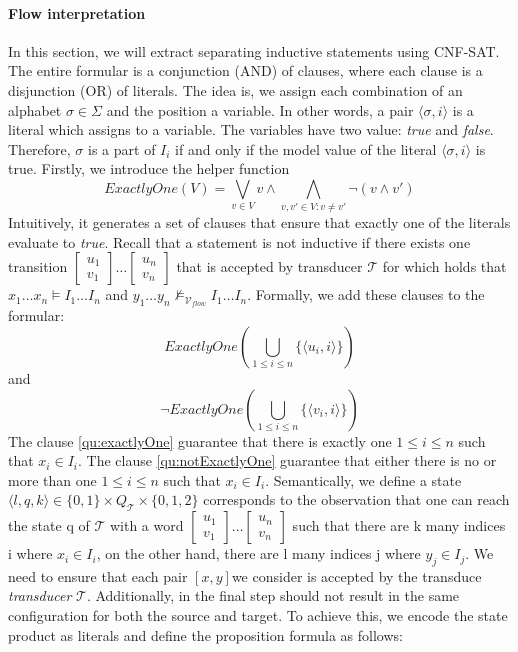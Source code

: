 \paragraph*{Flow interpretation}
In this section, we will extract separating inductive statements using CNF-SAT. 
The entire formular is a conjunction (AND) of clauses, where each clause is a disjunction (OR) of literals.
The idea is, we assign each combination of an alphabet $\sigma \in \Sigma$ and the position 
a variable. 
In other words, a pair $\langle \sigma, i \rangle$ is a literal which assigns to a variable.
The variables have two value: \textit{true} and \textit{false}.
Therefore, $\sigma$ is a part of $I_i$ if and only if the  model value of the literal $\langle \sigma, i \rangle$ is true.
Firstly, we introduce the helper function
\begin{equation*}
    ExactlyOne(V) = \bigvee_{v \in V} v \wedge \bigwedge_{v,v'\in V: v \neq v'} \lnot (v \wedge v')
\end{equation*}
Intuitively, it generates a set of clauses that ensure that exactly one of the 
literals evaluate to \textit{true}.
Recall that a statement is not inductive if there exists one transition
$[\substack{u_1 \\ v_1}] \dots [\substack{u_n \\ v_n}]$ that is accepted by transducer $\mathcal{T}$
for which holds that $x_1 \dots x_n \models I_1 \dots I_n$ and $y_1 \dots y_n \not\models_{\mathcal{V}_{flow}} I_1 \dots I_n$.
Formally, we add these clauses to the formular:
\begin{equation}\label{qu:exactlyOne}
    ExactlyOne(\bigcup_{1 \leq i \leq n} \{ \langle u_i, i \rangle \})
\end{equation}
and 
\begin{equation}\label{qu:notExactlyOne}
    \lnot ExactlyOne(\bigcup_{1 \leq i \leq n} \{ \langle v_i, i \rangle \})
\end{equation}
The clause \ref{qu:exactlyOne} guarantee that there is exactly one
$1 \leq i \leq n$ such that $x_i \in I_i$. 
The clause \ref{qu:notExactlyOne} guarantee that either there is no 
or more than one $1 \leq i \leq n$ such that $x_i \in I_i$.
Semantically, we define a state $\langle l,q,k \rangle \in \{0,1\} \times Q_{\mathcal{T}} \times \{0,1,2\}$ 
corresponds to the observation that one
can reach the state q of $\mathcal{T}$ with a word $[\substack{u_1 \\ v_1}] \dots [\substack{u_n \\ v_n}]$
such that there are k many indices i where $x_i \in I_i$, on the other hand,
there are l many indices j where $y_j \in I_j$.
We need to ensure that each pair $[x,y]$we consider is accepted by the transduce \textit{transducer} $\mathcal{T}$.
Additionally, in the final step should not result in the same configuration for both the source and target. 
To achieve this, we encode the state product as literals and define the proposition formula as follows:

